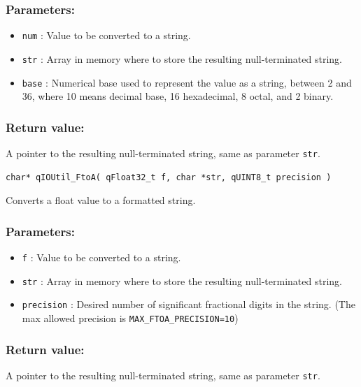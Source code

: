 \documentclass{article}
\begin{document}
\subsubsection*{Parameters:}
\begin{itemize}
    \item \lstinline{num} : Value to be converted to a string.
    \item \lstinline{str} : Array in memory where to store the resulting null-terminated string.
    \item \lstinline{base} : Numerical base used to represent the value as a string, between 2 and 36, where 10 means decimal base, 16 hexadecimal, 8 octal, and 2 binary.
\end{itemize}

\subsubsection*{Return value:}
A pointer to the resulting null-terminated string, same as parameter \lstinline{str}.


\noindent\hrulefill

\begin{lstlisting}[style=CStyle]
char* qIOUtil_FtoA( qFloat32_t f, char *str, qUINT8_t precision )
\end{lstlisting}

Converts a float value to a formatted string. 

\subsubsection*{Parameters:}
\begin{itemize}
    \item \lstinline{f} : Value to be converted to a string.
    \item \lstinline{str} : Array in memory where to store the resulting null-terminated string.
    \item \lstinline{precision} : Desired number of significant fractional digits in the string. (The max allowed precision is \lstinline{MAX_FTOA_PRECISION=10})
\end{itemize}

\subsubsection*{Return value:}
A pointer to the resulting null-terminated string, same as parameter \lstinline{str}.
\end{document}
